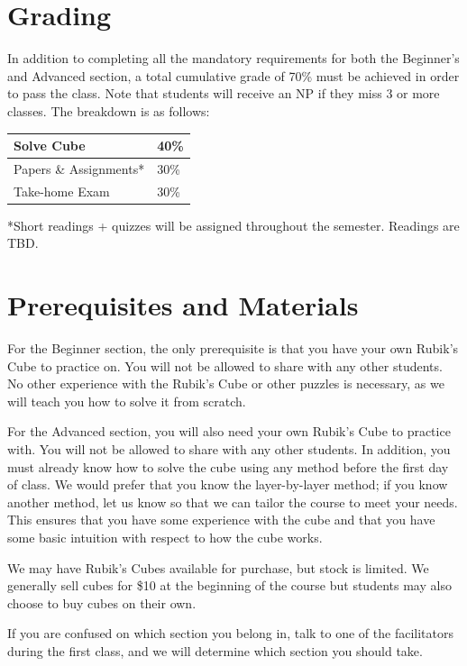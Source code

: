 \documentclass[11pt]{article}
\begin{document}
\section*{Grading}
In addition to completing all the mandatory requirements for both the Beginner’s and Advanced section, a total cumulative grade of 70\% must be achieved in order to pass the class. Note that students will receive an NP if they miss 3 or more classes. The breakdown is as follows:
\begin{center}
\begin{tabular}{|l|l|}
\hline
Solve Cube             & 40\% \\ \hline
Papers \& Assignments* & 30\% \\ \hline
Take-home Exam         & 30\% \\ \hline
\end{tabular}
\end{center}
\begin{footnotesize}
*Short readings + quizzes will be assigned throughout the semester. Readings are TBD. 
\end{footnotesize}

\section*{Prerequisites and Materials}
For the Beginner section, the only prerequisite is that you have your own Rubik’s Cube to practice on. You will not be allowed to share with any other students. No other experience with the Rubik’s Cube or other puzzles is necessary, as we will teach you how to solve it from scratch.

For the Advanced section, you will also need your own Rubik’s Cube to practice with. You will not be allowed to share with any other students. In addition, you must already know how to solve the cube using any method before the first day of class. We would prefer that you know the layer-by-layer method; if you know another method, let us know so that we can tailor the course to meet your needs. This ensures that you have some experience with the cube and that you have some basic intuition with respect to how the cube works.

We may have Rubik’s Cubes available for purchase, but stock is limited. We generally sell cubes for \$10 at the beginning of the course but students may also choose to buy cubes on their own.

If you are confused on which section you belong in, talk to one of the facilitators during the first class, and we will determine which section you should take.
\end{document}
